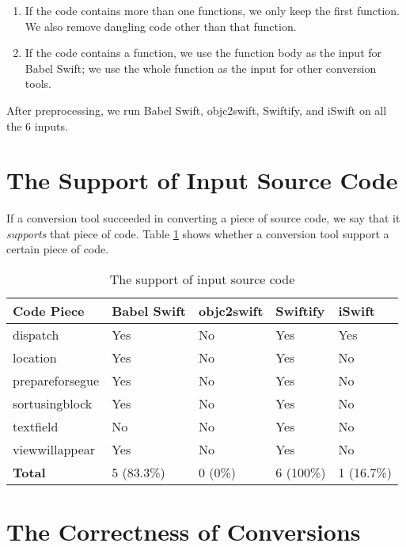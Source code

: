 \documentclass{sfuthesis}
\begin{document}
\begin{enumerate}
  \item If the code contains more than one functions, we only keep the first function. We also remove dangling code other than that function.
  \item If the code contains a function, we use the function body as the input for Babel Swift; we use the whole function as the input for other conversion tools.
\end{enumerate}

After preprocessing, we run Babel Swift, objc2swift, Swiftify, and iSwift on all the 6 inputs.

\section{The Support of Input Source Code}

If a conversion tool succeeded in converting a piece of source code, we say that it \emph{supports} that piece of code. Table \ref{table:numcodesupported} shows whether a conversion tool support a certain piece of code.

\begin{table}[H]
\begin{center}
\begin{tabular}{|l|l|l|l|l|}
\hline
\textbf{Code Piece} & Babel Swift & objc2swift & Swiftify & iSwift \\
\hline
dispatch        & Yes & No  & Yes & Yes \\
location        & Yes & No  & Yes & No  \\
prepareforsegue & Yes & No  & Yes & No  \\
sortusingblock  & Yes & No  & Yes & No  \\
textfield       & No  & No  & Yes & No  \\
viewwillappear  & Yes & No  & Yes & No  \\
\hline
\textbf{Total}  & 5 (83.3\%) & 0 (0\%) & 6 (100\%) & 1 (16.7\%) \\
\hline
\end{tabular}
\end{center}
\caption{The support of input source code}
\label{table:numcodesupported}
\end{table}

\section{The Correctness of Conversions}
\end{document}
